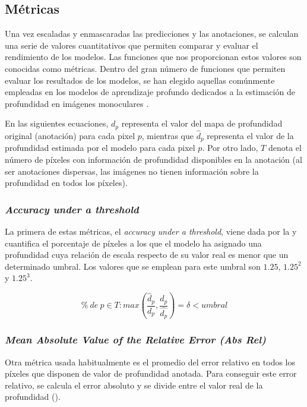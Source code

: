 \subsection{Métricas}
Una vez escaladas y enmascaradas las predicciones y las anotaciones, se calculan una serie de valores cuantitativos que permiten comparar y evaluar el rendimiento de los modelos. Las funciones que nos proporcionan estos valores son conocidas como métricas. Dentro del gran número de funciones que permiten evaluar los resultados de los modelos, se han elegido aquellas comúnmente empleadas en los modelos de aprendizaje profundo dedicados a la estimación de profundidad en imágenes monoculares \cite{visiontransformersDPT,bhat2020adabins,eigen-multi-scale,midas-intel,bts,DORN,evaluation-cnn-depth-estimation, depth-estimation-metrics}.

En las siguientes ecuaciones, $d_p$ representa el valor del mapa de profundidad original (anotación) para cada pixel $p$, mientras que $\hat{d}_p$ representa el valor de la profundidad estimada por el modelo para cada pixel $p$. Por otro lado, $T$ denota el número de píxeles con información de profundidad disponibles en la anotación (al ser anotaciones dispersas, las imágenes no tienen información sobre la profundidad en todos los píxeles).


\subsubsection{\textit{Accuracy under a threshold}}
La primera de estas métricas, el \textit{accuracy under a threshold}, viene dada por la  y cuantifica el porcentaje de píxeles a los que el modelo ha asignado una profundidad cuya relación de escala respecto de su valor real es menor que un determinado umbral. Los valores que se emplean para este umbral son $1.25$, $1.25^2$ y $1.25^3$.

\begin{equation}
\label{eqn:accuracy_under_thr}
\% \ de \ p \in T : max(\frac{\hat{d}_p}{d_p},\frac{d_p}{\hat{d_p}}) = \delta < umbral 
\end{equation}

\subsubsection{\textit{Mean Absolute Value of the Relative Error (Abs Rel)}}
Otra métrica usada habitualmente es el promedio del error relativo en todos los píxeles que disponen de valor de profundidad anotada. Para conseguir este error relativo, se calcula el error absoluto y se divide entre el valor real de la profundidad ().

